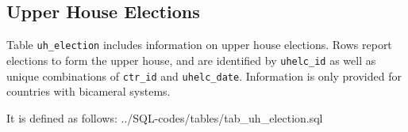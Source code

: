 \subsection{Upper House Elections}\label{subsec_tab_uh_election}

Table \texttt{uh\_election} includes information on upper house elections. 
Rows report elections to form the upper house, and are identified by \texttt{uhelc\_id} as well as unique combinations of \texttt{ctr\_id} and \texttt{uhelc\_date}. 
Information is only provided for countries with bicameral systems.

It is defined as follows:
%
{../SQL-codes/tables/tab_uh_election.sql}
